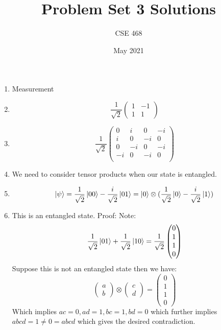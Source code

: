 \documentclass[12pt]{article}
\title{Problem Set 3 Solutions}
\author{CSE 468}
\date{May 2021}
\begin{document}
\maketitle

\begin{enumerate}[font=\bfseries]
    \item Measurement
    \item \[ \frac{1}{\sqrt{2}}\begin{pmatrix}
        1 & -1 \\
        1 & 1
        \end{pmatrix}
        \]
    \item \[ \frac{1}{\sqrt{2}}\begin{pmatrix}
        0 & i & 0 & -i \\
        i & 0 & -i & 0 \\
        0 & -i & 0 & -i \\
        -i & 0 & -i & 0 \\
        \end{pmatrix}
        \]
    \item We need to consider tensor products when our state is entangled.
    \item \[\ket{\psi} = \frac{1}{\sqrt{2}}\ket{00} - \frac{i}{\sqrt{2}}\ket{01} = \ket{0} \otimes (\frac{1}{\sqrt{2}}\ket{0} - \frac{i}{\sqrt{2}}\ket{1})\]
    \item This is an entangled state. Proof: Note:
    \[\frac{1}{\sqrt{2}}\ket{01} + \frac{1}{\sqrt{2}}\ket{10} = 
            \frac{1}{\sqrt{2}}
            \begin{pmatrix}
            0 \\ 1 \\ 1 \\ 0
            \end{pmatrix}
            \]
        Suppose this is not an entangled state then we have:
        \[\begin{pmatrix}
        a \\b
        \end{pmatrix}
        \otimes
        \begin{pmatrix}
        c \\d
        \end{pmatrix}
        =
        \begin{pmatrix}
        0 \\ 1 \\ 1 \\ 0
        \end{pmatrix}
        \]
        Which implies $ac = 0, ad = 1, bc = 1, bd = 0$ which further implies $abcd = 1 \neq 0 = abcd$ which gives the desired contradiction.
        

\end{enumerate}
\end{document}
